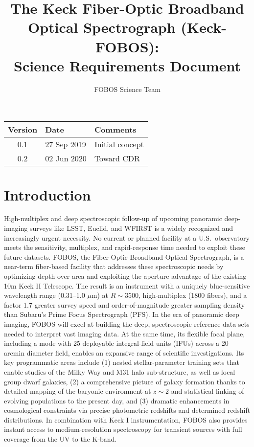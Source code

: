 \documentclass[preprint,11pt]{aastex}
\title{The Keck Fiber-Optic Broadband Optical Spectrograph (Keck-FOBOS): \\ Science Requirements Document}
\author{\Large FOBOS Science Team}
\begin{document}
\maketitle


\bigskip
\bigskip
\bigskip
\bigskip

\begin{table}[!h]
    \centering
    \begin{tabular}{|c|l|l|}
    \hline
    Version & Date & Comments \\
    \hline
        0.1 & 27 Sep 2019 & Initial concept \\
        0.2 & 02 Jun 2020 & Toward CDR \\
    \hline
    \end{tabular}
\end{table}

\newpage

\setcounter{tocdepth}{3}
\setcounter{secnumdepth}{3}
\tableofcontents

\newpage

\section{Introduction}
\label{srd:intro}

High-multiplex and deep spectroscopic follow-up of upcoming panoramic deep-imaging surveys like LSST, Euclid, and
WFIRST is a widely recognized and increasingly urgent necessity. No current or planned facility at a U.S.~observatory
meets the sensitivity, multiplex, and rapid-response time needed to exploit these future datasets. FOBOS, the
Fiber-Optic Broadband Optical Spectrograph, is a near-term fiber-based facility that addresses these spectroscopic
needs by optimizing depth over area and exploiting the aperture advantage of the existing 10m Keck II Telescope. The
result is an instrument with a uniquely blue-sensitive wavelength range (0.31--1.0 $\mu$m) at $R \sim 3500$,
high-multiplex (1800 fibers), and a factor 1.7 greater survey speed and order-of-magnitude greater sampling density
than Subaru's Prime Focus Spectrograph (PFS). In the era of panoramic deep imaging, FOBOS will excel at building the
deep, spectroscopic reference data sets needed to interpret vast imaging data. At the same time, its flexible focal
plane, including a mode with 25 deployable integral-field units (IFUs) across a 20 arcmin diameter field, enables an
expansive range of scientific investigations. Its key programmatic areas include (1) nested stellar-parameter training
sets that enable studies of the Milky Way and M31 halo sub-structure, as well as local group dwarf galaxies, (2) a
comprehensive picture of galaxy formation thanks to detailed mapping of the baryonic environment at $z \sim 2$ and
statistical linking of evolving populations to the present day, and (3) dramatic enhancements in cosmological
constraints via precise photometric redshifts and determined redshift distributions.  In combination with Keck I
instrumentation, FOBOS also provides instant access to medium-resolution spectroscopy for transient sources with full
coverage from the UV to the K-band.
\end{document}
